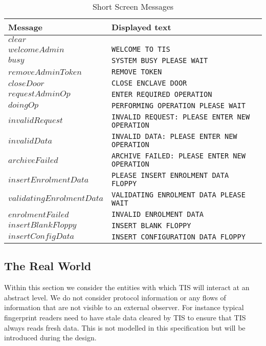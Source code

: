 \begin{table}[h]
\begin{tabular}{|l|l|}
{\bf Message}   &  {\bf Displayed text}   \\
\hline
$clear$                 &                               \\
$welcomeAdmin$          & {\tt WELCOME TO TIS}          \\
$busy$                  & {\tt SYSTEM BUSY PLEASE WAIT} \\ 
$removeAdminToken$      & {\tt REMOVE TOKEN} \\
$closeDoor$             & {\tt CLOSE ENCLAVE DOOR} \\
$requestAdminOp$        & {\tt ENTER REQUIRED OPERATION} \\
$doingOp$               & {\tt PERFORMING OPERATION PLEASE WAIT} \\
$invalidRequest$        & {\tt INVALID REQUEST: PLEASE ENTER NEW
OPERATION} \\
$invalidData$           & {\tt INVALID DATA: PLEASE ENTER NEW
OPERATION} \\
$archiveFailed$         & {\tt ARCHIVE FAILED: PLEASE ENTER NEW
OPERATION} \\
$insertEnrolmentData$   & {\tt PLEASE INSERT ENROLMENT DATA FLOPPY} \\
$validatingEnrolmentData$ & {\tt VALIDATING ENROLMENT DATA PLEASE WAIT
} \\
$enrolmentFailed$       & {\tt INVALID ENROLMENT DATA} \\
$insertBlankFloppy$     & {\tt INSERT BLANK FLOPPY} \\
$insertConfigData$      & {\tt INSERT CONFIGURATION DATA FLOPPY} \\
\hline
\end{tabular}
\caption{Short Screen Messages}
\label{tab:screen}
\end{table}

\subsection{The Real World}

Within this section we consider the entities with which TIS will
interact at an abstract level. We do not consider protocol information
or any flows of information that are not visible to an external
observer. For instance typical fingerprint readers need to have stale
data cleared by TIS to ensure that TIS always reads fresh data. This is
not modelled in this specification but will be introduced during the design.

